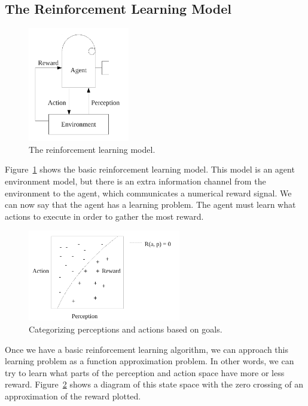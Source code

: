 \subsection{The Reinforcement Learning Model}

\begin{figure}[bth]
  \center
  \includegraphics[height=5cm]{gfx/reinforcement_learning}
  \caption[The reinforcement learning model]{The reinforcement learning model.}
  \label{fig:reinforcement_learning}
\end{figure}

Figure~\ref{fig:reinforcement_learning} shows the basic reinforcement
learning model.  This model is an agent environment model, but there
is an extra information channel from the environment to the agent,
which communicates a numerical reward signal.  We can now say that the
agent has a learning problem.  The agent must learn what actions to
execute in order to gather the most reward.

\begin{figure}[bth]
  \center
  \includegraphics[height=4cm]{gfx/perception_categorization}
  \caption[Categorizing perceptions and actions based on goals]{Categorizing perceptions and actions based on goals.}
  \label{fig:perception_categorization}
\end{figure}

Once we have a basic reinforcement learning algorithm, we can approach
this learning problem as a function approximation problem.  In other
words, we can try to learn what parts of the perception and action
space have more or less reward.
Figure~\ref{fig:perception_categorization} shows a diagram of this
state space with the zero crossing of an approximation of the reward
plotted.

